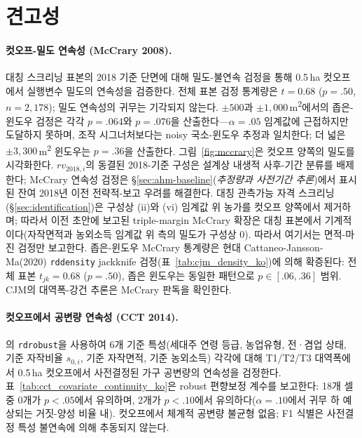 \documentclass[12pt, a4paper]{article}
\begin{document}
\section{견고성}
\label{sec:robustness}

\paragraph{컷오프-밀도 연속성 (McCrary 2008).} 대칭 스크리닝 표본의 2018 기준 단면에 대해 \citet{McCrary2008_density} 밀도-불연속 검정을 통해 0.5\,ha 컷오프에서 실행변수 밀도의 연속성을 검증한다. 전체 표본 검정 통계량은 $t = 0.68$ ($p = .50$, $n = 2{,}178$); 밀도 연속성의 귀무는 기각되지 않는다. $\pm 500$과 $\pm 1{,}000$\,m\textsuperscript{2}에서의 좁은-윈도우 검정은 각각 $p = .064$와 $p = .076$을 산출한다---$\alpha = .05$ 임계값에 근접하지만 도달하지 못하며, 조작 시그너처보다는 noisy 국소-윈도우 추정과 일치한다; 더 넓은 $\pm 3{,}300$\,m\textsuperscript{2} 윈도우는 $p = .36$을 산출한다. 그림~\ref{fig:mccrary}은 컷오프 양쪽의 밀도를 시각화한다. $rv_{2018,i}$의 동결된 2018-기준 구성은 설계상 내생적 사후-기간 분류를 배제한다; McCrary 연속성 검정은 \S\ref{sec:ahm-baseline}(\textit{추정량과 사전기간 추론})에서 표시된 잔여 2018년 이전 전략적-보고 우려를 해결한다. 대칭 관측가능 자격 스크리닝(\S\ref{sec:identification})은 구성상 (ii)와 (vi) 임계값 위 농가를 컷오프 양쪽에서 제거하며; 따라서 이전 초안에 보고된 triple-margin McCrary 확장은 대칭 표본에서 기계적이다(자작면적과 농외소득 임계값 위 측의 밀도가 구성상 0). 따라서 여기서는 면적-마진 검정만 보고한다. 좁은-윈도우 McCrary 통계량은 현대 Cattaneo-Jansson-Ma(2020) \texttt{rddensity} jackknife 검정(표~\ref{tab:cjm_density_ko})에 의해 확증된다: 전체 표본 $t_{jk} = 0.68$ ($p = .50$), 좁은 윈도우는 동일한 패턴으로 $p \in [.06, .36]$ 범위. CJM의 대역폭-강건 추론은 McCrary 판독을 확인한다.



\paragraph{컷오프에서 공변량 연속성 (CCT 2014).} \citet{CalonicoCattaneoTitiunik2014_rdrobust}의 \texttt{rdrobust}을 사용하여 6개 기준 특성(세대주 연령 등급, 농업유형, 전·겸업 상태, 기준 자작비율 $s_{0,i}$, 기준 자작면적, 기준 농외소득) 각각에 대해 T1/T2/T3 대역폭에서 0.5\,ha 컷오프에서 사전결정된 가구 공변량의 연속성을 검정한다. 표~\ref{tab:cct_covariate_continuity_ko}은 robust 편향보정 계수를 보고한다: 18개 셀 중 0개가 $p < .05$에서 유의하며, 2개가 $p < .10$에서 유의하다($\alpha = .10$에서 귀무 하 예상되는 거짓-양성 비율 내). 컷오프에서 체계적 공변량 불균형 없음; F1 식별은 사전결정 특성 불연속에 의해 추동되지 않는다.
\end{document}
